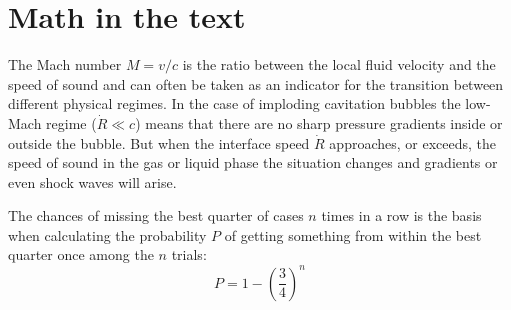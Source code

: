 \chapter{Math in the text}%

The Mach number $M=v/c$ is the ratio between the local fluid velocity and the speed of sound and can often be taken as an indicator for the transition between different physical regimes. In the case of imploding cavitation bubbles the low-Mach regime ($\dot{R}\ll c$) means that there are no sharp pressure gradients inside or outside the bubble. But when the interface speed $\dot{R}$ approaches, or exceeds, the speed of sound in the gas or liquid phase the situation changes and gradients or even shock waves will arise.

The chances of missing the best quarter of cases $n$ times in a row is the basis when calculating the probability $P$ of getting something from within the best quarter once among the $n$ trials:
\begin{equation}
P=1-\left( \frac{3}{4} \right)^n
\end{equation}



